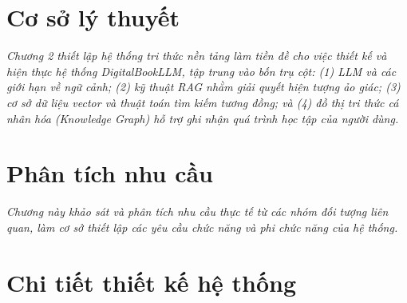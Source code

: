 \documentclass[12pt]{report}
\begin{document}








\chapter{Cơ sở lý thuyết}

\textit{Chương 2 thiết lập hệ thống tri thức nền tảng làm tiền đề cho việc thiết kế và hiện thực hệ thống DigitalBookLLM, tập trung vào bốn trụ cột: (1) LLM và các giới hạn về ngữ cảnh; (2) kỹ thuật RAG nhằm giải quyết hiện tượng ảo giác; (3) cơ sở dữ liệu vector và thuật toán tìm kiếm tương đồng; và (4) đồ thị tri thức cá nhân hóa (Knowledge Graph) hỗ trợ ghi nhận quá trình học tập của người dùng.}









\chapter{Phân tích nhu cầu}

\textit{Chương này khảo sát và phân tích nhu cầu thực tế từ các nhóm đối tượng liên quan, làm cơ sở thiết lập các yêu cầu chức năng và phi chức năng của hệ thống.}











\chapter{Chi tiết thiết kế hệ thống}
\end{document}
